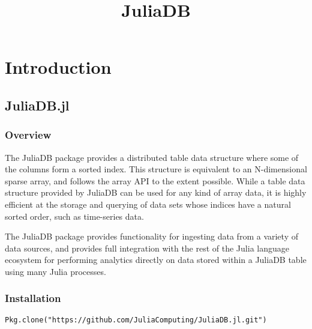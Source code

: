 \documentclass{memoir}
\title{JuliaDB}
\author{}
\begin{document}
\frontmatter
\maketitle
\tableofcontents

\mainmatter



\part{Introduction}




\hypertarget{8567594541938070074}{}


\chapter{JuliaDB.jl}



\hypertarget{1191680443471067081}{}


\section{Overview}



The JuliaDB package provides a distributed table data structure where some of the columns form a sorted index. This structure is equivalent to an N-dimensional sparse array, and follows the array API to the extent possible. While a table data structure provided by JuliaDB can be used for any kind of array data, it is highly efficient at the storage and querying of data sets whose indices have a natural sorted order, such as time-series data.



The JuliaDB package provides functionality for ingesting data from a variety of data sources, and provides full integration with the rest of the Julia language ecosystem for performing analytics directly on data stored within a JuliaDB table using many Julia processes.



\hypertarget{14749083378597845891}{}


\section{Installation}




\begin{verbatim}
Pkg.clone("https://github.com/JuliaComputing/JuliaDB.jl.git")
\end{verbatim}
\end{document}
